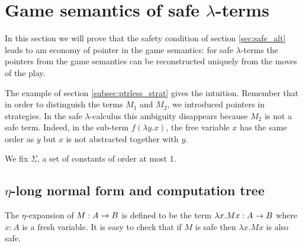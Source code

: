 \def\cmptre#1{\tau(#1)}
\def\aux#1{\lceil #1\rceil}
\def\nf#1{\eta_{\sf nf}(#1)}

\section{Game semantics of safe $\lambda$-terms}

In this section we will prove that the safety condition
of section \ref{sec:safe_alt} leads to am economy of pointer in the game
semantics: for safe $\lambda$-terms the pointers from the game semantics can be reconstructed uniquely from the moves of
the play.

The example of section \ref{subsec:ptrless_strat} gives the intuition.
Remember that in order to distinguish the terms $M_1$ and $M_2$,
we introduced pointers in strategies. In the safe $\lambda$-calculus
this ambiguity disappears because $M_2$ is not a safe term. Indeed, in the
sub-term $f (\lambda y . x)$, the free variable $x$
has the same order as $y$ but $x$ is not abstracted together
with $y$.

We fix $\Sigma$, a set of constants of order at most 1.
%
%






\subsection{$\eta$-long normal form and computation tree}

The $\eta$-expansion of $M: A\rightarrow B$ is defined to be the term $\lambda x . M x : A\rightarrow B$ where $x:A$ is a fresh variable.
It is easy to check that if $M$ is safe then $\lambda x . M x$ is also safe.

